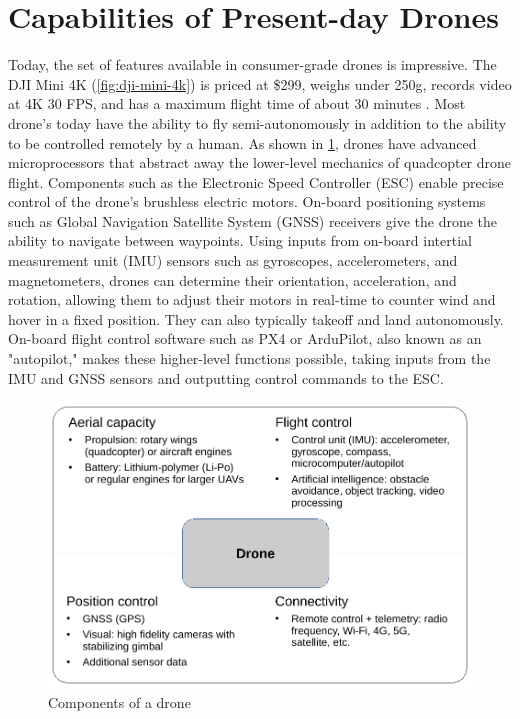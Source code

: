 \section{Capabilities of Present-day Drones}
\label{sec:drone-capabilities}

Today, the set of features available in consumer-grade drones is impressive.
The DJI Mini 4K (\cref{fig:dji-mini-4k}) is priced at \$299, weighs under 250g,
records video at 4K 30 FPS, and has a maximum flight time of about 30 minutes
\cite{dji_mini_4k}. Most drone's today have the ability to fly
semi-autonomously in addition to the ability to be controlled remotely by a
human. As shown in \cref{fig:drone-components}, drones have advanced
microprocessors that abstract away the lower-level mechanics of quadcopter
drone flight. Components such as the Electronic Speed Controller (ESC) enable
precise control of the drone's brushless electric motors. On-board positioning
systems such as Global Navigation Satellite System (GNSS) receivers give the
drone the ability to navigate between waypoints.  Using inputs from on-board
intertial measurement unit (IMU) sensors such as gyroscopes, accelerometers,
and magnetometers, drones can determine their orientation, acceleration, and
rotation, allowing them to adjust their motors in real-time to counter wind and
hover in a fixed position. They can also typically takeoff and land
autonomously. On-board flight control software such as PX4 or ArduPilot, also
known as an "autopilot," makes these higher-level functions possible, taking
inputs from the IMU and GNSS sensors and outputting control commands to the
ESC.

\begin{figure}[htbp]
\centerline{\includegraphics[width = .6\textwidth]{figs/drone-components-crop.pdf}}
\caption{Components of a drone \cite{giones2017}}
\label{fig:drone-components}
\end{figure}

